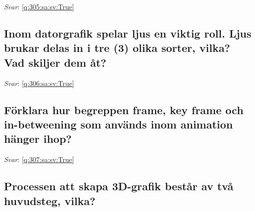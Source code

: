 \documentclass[a4paper,11pt,oneside]{article}
\begin{document}
\begin{sloppypar}
\label{q:305:sa:sv:False}

\vspace{2cm}

\noindent\makebox[\textwidth]{\hrulefill}

\vspace{1cm}

\textit{Svar}: \autoref{q:305:sa:sv:True}



\subsection{Inom datorgrafik spelar ljus en viktig roll. Ljus brukar delas in i tre (3) olika sorter, vilka? Vad skiljer dem \r{a}t?}

\label{q:306:sa:sv:False}

\vspace{2cm}

\noindent\makebox[\textwidth]{\hrulefill}

\vspace{1cm}

\textit{Svar}: \autoref{q:306:sa:sv:True}



\subsection{F\"orklara hur begreppen frame, key frame och in-betweening som anv\"ands inom animation h\"anger ihop?}

\label{q:307:sa:sv:False}

\vspace{2cm}

\noindent\makebox[\textwidth]{\hrulefill}

\vspace{1cm}

\textit{Svar}: \autoref{q:307:sa:sv:True}



\subsection{Processen att skapa 3D-grafik best\r{a}r av tv\r{a} huvudsteg, vilka?}

\label{q:308:sa:sv:False}

\vspace{2cm}

\noindent\makebox[\textwidth]{\hrulefill}

\vspace{1cm}


\end{sloppypar}
\end{document}
